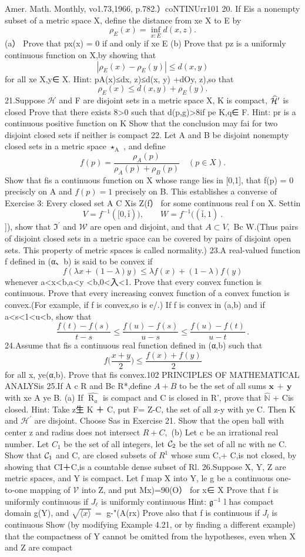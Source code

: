 Amer. Math. Monthly, vo1.73,1966, p.782.）coNTINUrr101 20. If Eis a nonempty subset of a metric space X, define the distance from xe X to E by $$ \rho_{E}(x)=\operatorname*{inf}_{x:E}d(x,z). $$ (a） Prove that px(x) = 0 if and only if xe E (b) Prove that pz is a uniformly continuous function on X,by showing that $$ \left|\rho_{E}(x)-\rho_{E}(y)\right|\leq d(x,y) $$ for all xe X,y∈ X. Hint: pA(x)≤dx, z)≤d(x, y) +dOy, z),so that $$ \rho_{E}(x)\leq d(x,y)+\rho_{E}(y). $$ 21.Suppose ${\mathcal{H}}$ and F are disjoint sets in a metric space X, K is compact, $\widehat{\cal H}^{\prime}$ is closed Prove that there exists 8>0 such that d(p,g)>8if pe K,q∈ F. Hint: pr is a continuous positive function on K Show that the conclusion may fai for two disjoint closed sets if neither is compact 22. Let A and B be disjoint nonempty closed sets in a metric space $\star_{\mathrm{{A}}}$ , and define $$ f(p)={\frac{\rho_{A}(p)}{\rho_{A}(p)+\rho_{B}(p)}}\quad(p\in X). $$ Show that fis a continuous function on X whose range lies in [0,1], that f(p) = 0 preciscly on A and $f(p)=1$ precisely on B. This establishes a converse of Exercise 3: Every closed set A C Xis Z(f） for some continuous real f on X. Settin $$ V=f^{-1}([0,\mathrm{\bar{i}})),\qquad W=f^{-1}((\mathrm{\bar{i}},1)\ . $$ ]), show that ${\mathfrak{I}}^{\prime}$ and ${\mathcal{W}}$ are open and disjoint, and that $A\subset V,$ Bc W.(Thus pairs of disjoint closed sets in a metric space can be covered by pairs of disjoint open sets. This property of metric spaces is called normality.) 23.A real-valued function f defined in (α、b) is said to be convex if $$ f(\lambda x+(1-\lambda)y)\leq\lambda f(x)+(1-\lambda)f(y) $$ whenever a<x<b,a<y <b,0<入<1. Prove that every convex function is continuous. Prove that every increasing convex function of a convex function is convex.(For example, if f is convex,so is e/.) If f is convex in (a,b) and if a<s<1<u<b, show that $$ {\frac{f(t)-f(s)}{t-s}}\leq{\frac{f(u)-f(s)}{u-s}}\leq{\frac{f(u)-f(t)}{u-t}}\,. $$ 24.Assume that fis a continuous real function defined in (α,b) such that $$ f{\biggl(}{\frac{x+y}{2}}{\biggr)}\leq{\frac{f(x)+f(y)}{2}} $$ for all x, ye(α,b). Prove that fis convex.102 PRINCIPLES OF MATHEMATICAL ANALYSis 25.If A c R and Bc R*,define $A+B$ to be the set of all sums $\mathbf{x}\,+\,\mathbf{y}$ with xe A ye B. (a) If ${\widehat{\operatorname{R}_{a}}}$ is compact and C is closed in R', prove that ${\widehat{\mathbb{N}}}$ + Cis closed. Hint: Take z生 K ＋ C, put F= Z-C, the set of all z-y with ye C. Then K and ${\mathcal{H}}^{\prime}$ are disjoint. Choose Sas in Exercise 21. Show that the open ball with center z and radius does not intersect $R+C,$ (b) Let c be an irrational real number. Let ${\mathit{C}}_{1}$ be the set of all integers, let ${\cal{C}}_{2}$ be the set of all nc with ne C. Show that ${\cal C}_{1}$ and C, are closed subsets of $\textstyle{R^{1}}$ whose sum C,+ C,is not closed, by showing that CI＋C,is a countable dense subset of Rl. 26.Suppose X, Y, Z are metric spaces, and Y is compact. Let f map X into Y, le g be a continuous one-to-one mapping of ${\mathcal{V}}$ into Z, and put Mx)=90(O） for x∈ X Prove that f is uniformly continuous if $J_{\ell}$ is uniformly continuous Hint: ${\mathfrak{g}}^{-1}$ l has compact domain g(Y), and $\scriptstyle{\sqrt{\langle x\rangle}}\,=$ g-"(A(rx) Prove also that f is continuous if $J_{\mathit{l}}$ is continuous Show (by modifying Example 4.21, or by finding a different example) that the compactness of Y cannot be omitted from the hypotheses, even when X and Z are compact